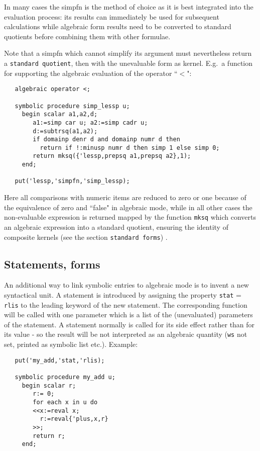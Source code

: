 In many cases the simpfn is the method of choice as it is
best integrated into the {\reduce} evaluation process: its
results can immediately be used for subsequent calculations
while algebraic form results need to be converted to
standard quotients before combining them with other
formulae.

Note that a simpfn which  cannot simplify its
argument must nevertheless return a {\tt standard quotient},
then with the unevaluable form as kernel. E.g.\  a function
for supporting the algebraic evaluation of the operator ``$<$":

\begin{verbatim}
   algebraic operator <;
 
   symbolic procedure simp_lessp u;
     begin scalar a1,a2,d;
        a1:=simp car u; a2:=simp cadr u;
        d:=subtrsq(a1,a2);
        if domainp denr d and domainp numr d then
          return if !:minusp numr d then simp 1 else simp 0;
        return mksq({'lessp,prepsq a1,prepsq a2},1);
     end;

   put('lessp,'simpfn,'simp_lessp);
\end{verbatim}

Here all comparisons with numeric items are reduced to zero or one
because of the equivalence of zero and ``false" in algebraic mode, while
in all other cases the non-evaluable expression is returned mapped by
the function {\tt mksq} which converts an algebraic
expression into a standard quotient, ensuring the
identity of composite kernels (see the section {\tt standard forms})
.

\subsection{Statements, forms}

An additional way to link symbolic entries to algebraic
mode is to invent a new syntactical unit. A {\reduce}
statement is introduced by assigning the
property {\tt stat} = {\tt rlis} 
to the leading keyword 
of the new statement. The corresponding function will be called with
one parameter which is a list of the (unevaluated)
parameters of the statement. A statement normally
is called for its side effect rather than for its
value - so the result will be not interpreted as
an algebraic quantity ({\tt ws} not set, printed
as symbolic list etc.). Example:

\begin{verbatim}
   put('my_add,'stat,'rlis);
 
   symbolic procedure my_add u;
     begin scalar r;
        r:= 0;
        for each x in u do 
        <<x:=reval x;
          r:=reval{'plus,x,r}
        >>;
        return r;
     end;

\end{verbatim}

